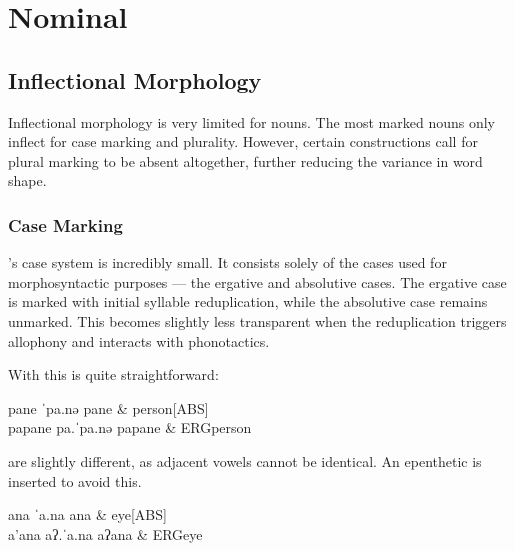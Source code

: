 \chapter{Nominal}\label{ch:morpho-nom}
\section{Inflectional Morphology}\label{sec:morpho-nom-inf}
Inflectional morphology is very limited for nouns. The most marked nouns only inflect for case marking and plurality. However, certain constructions call for plural marking to be absent altogether, further reducing the variance in word shape.

\subsection{Case Marking}\label{sec:case-marking}
\langname 's case system is incredibly small. It consists solely of the cases used for morphosyntactic purposes --- the ergative and absolutive cases. The ergative case is marked with initial syllable reduplication, while the absolutive case remains unmarked. This becomes slightly less transparent when the reduplication triggers allophony and interacts with phonotactics.


With  this is quite straightforward:

\begin{subexamples}
  \ex
    \preamble pane
    \pronunciation ˈpa.nə
    \gloss
      pane & person[ABS] \\
  \ex
    \preamble papane
    \pronunciation pa.ˈpa.nə
    \gloss
      pa\allo pane & ERG\allo person \\
\end{subexamples}

 are slightly different, as adjacent vowels cannot be identical. An epenthetic  is inserted to avoid this.

\begin{subexamples}
  \ex
    \preamble ana
    \pronunciation ˈa.na
    \gloss
      ana & eye[ABS] \\
  \ex
    \preamble a'ana
    \pronunciation aʔ.ˈa.na
    \gloss
      aʔ\allo ana & ERG\allo eye \\
\end{subexamples}


